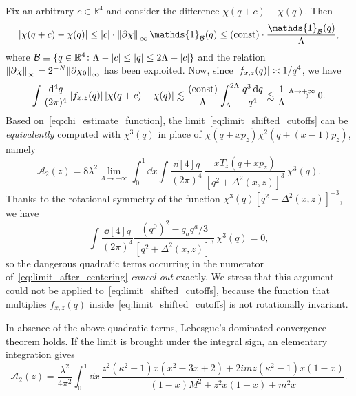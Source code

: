 \documentclass[a4paper, 11pt]{article}
\newcommand{\R}{\mathbb{R}}
\newcommand{\cutoff}{\Lambda}								%
\newcommand{\id}{\mathds{1}}								%
\theoremstyle{thm}
\begin{document}
Fix an arbitrary $c \in \R^4$ and consider the difference $\chi(q + c) - \chi(q)$. Then
\begin{equation}
\label{eq:chi_estimate}
\abs{\chi(q + c) - \chi(q)} \le \abs{c} \cdot \norm*{\partial \chi}_\infty \, \id_\mathcal{B}(q) \le (\mathrm{const}) \cdot \frac{\id_\mathcal{B}(q)}{\cutoff},
\end{equation}
where $\mathcal{B} \equiv \lbrace q \in \R^4 \colon \cutoff - \abs{c} \le \abs{q} \le 2 \cutoff + \abs{c} \rbrace$ and the relation $\norm{\partial \chi}_\infty = 2^{-N} \norm{\partial \chi_0}_\infty$ has been exploited. Now, since $\abs{f_{x, z}(q)} \asymp 1/q^4$, we have
\begin{equation}
\label{eq:chi_estimate_function}
\int \frac{\dd[4]{q}}{(2\pi)^4} \, \abs{f_{x, z}(q)} \, \abs{\chi(q + c) - \chi(q)} \lesssim \frac{(\mathrm{const})}{\cutoff} \int_\cutoff^{2 \cutoff} \frac{q^3\dd{q}}{q^4} \lesssim \frac{1}{\cutoff} \overset{\cutoff \to +\infty}{\longrightarrow} 0.
\end{equation} 
Based on~\eqref{eq:chi_estimate_function}, the limit~\eqref{eq:limit_shifted_cutoffs} can be \emph{equivalently} computed with $\chi^3(q)$ in place of $\chi(q + x p_z) \chi^2(q + (x - 1)p_z)$, namely
\begin{equation}
\label{eq:limit_after_centering}
\mathcal{A}_2(z) = 8 \lambda^2 \lim_{\cutoff \to +\infty} \int_0^1 \dd{x} \int \frac{\dd[4]{q}}{(2\pi)^4} \, \frac{x T_z(q + x p_z)}{[q^2 + \Delta^2(x, z)]^3} \, \chi^3(q).
\end{equation} 
Thanks to the rotational symmetry of the function $\chi^3(q)[q^2 + \Delta^2(x, z)]^{-3}$, we have
\begin{equation}
\int \frac{\dd[4]{q}}{(2\pi)^4} \frac{(q^0)^2 - q_a q^a/3}{[q^2 + \Delta^2(x, z)]^3} \, \chi^3(q) = 0,
\end{equation} 
so the dangerous quadratic terms occurring in the numerator of~\eqref{eq:limit_after_centering} \emph{cancel out} exactly. We stress that this argument could not be applied to~\eqref{eq:limit_shifted_cutoffs}, because the function that multiplies $f_{x, z}(q)$ inside~\eqref{eq:limit_shifted_cutoffs} is not rotationally invariant.

In absence of the above quadratic terms, Lebesgue's dominated convergence theorem holds. If the limit is brought under the integral sign, an elementary integration gives
\begin{equation}
\label{eq:gfunction_pert}
\mathcal{A}_2(z) = \frac{\lambda^2}{4\pi^2} \int_0^1 \dd{x} \, \frac{z^2 (\kappa^2 + 1)x(x^2 - 3x + 2) + 2imz(\kappa^2 - 1) x(1-x)}{(1 - x)M^2 + z^2x(1-x) + m^2 x}.
\end{equation}
\end{document}
